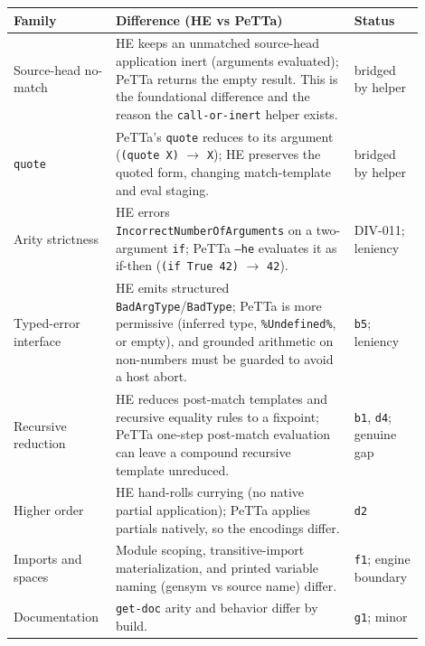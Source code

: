\documentclass[11pt]{article}
\newcommand{\code}[1]{\texttt{#1}}
\newcommand{\HE}{\textup{HE}}
\newcommand{\PeTTa}{\textup{PeTTa}}
\begin{document}
\begin{longtable}{>{\raggedright\arraybackslash}p{0.19\linewidth}
                  >{\raggedright\arraybackslash}p{0.55\linewidth}
                  >{\raggedright\arraybackslash}p{0.16\linewidth}}
\toprule
Family & Difference (\HE{} vs \PeTTa{}) & Status \\
\midrule
\endhead
Source-head no-match & \HE{} keeps an unmatched source-head application inert
(arguments evaluated); \PeTTa{} returns the empty result.  This is the
foundational difference and the reason the \code{call-or-inert} helper exists. &
bridged by helper \\
\code{quote} & \PeTTa{}'s \code{quote} reduces to its argument
(\code{(quote X)} $\to$ \code{X}); \HE{} preserves the quoted form, changing
match-template and eval staging. & bridged by helper \\
Arity strictness & \HE{} errors \code{IncorrectNumberOfArguments} on a
two-argument \code{if}; \PeTTa{} \code{--he} evaluates it as if-then
(\code{(if True 42)} $\to$ \code{42}). & DIV-011; leniency \\
Typed-error interface & \HE{} emits structured \code{BadArgType}/\code{BadType};
\PeTTa{} is more permissive (inferred type, \code{\%Undefined\%}, or empty), and
grounded arithmetic on non-numbers must be guarded to avoid a host abort. &
\code{b5}; leniency \\
Recursive reduction & \HE{} reduces post-match templates and recursive equality
rules to a fixpoint; \PeTTa{} one-step post-match evaluation can leave a compound
recursive template unreduced. & \code{b1}, \code{d4}; genuine gap \\
Higher order & \HE{} hand-rolls currying (no native partial application);
\PeTTa{} applies partials natively, so the encodings differ. & \code{d2} \\
Imports and spaces & Module scoping, transitive-import materialization, and
printed variable naming (gensym vs source name) differ. & \code{f1}; engine
boundary \\
Documentation & \code{get-doc} arity and behavior differ by build. & \code{g1};
minor \\
\bottomrule
\end{longtable}
\end{document}
